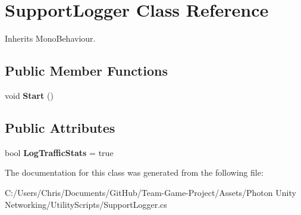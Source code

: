 \hypertarget{class_support_logger}{}\section{Support\+Logger Class Reference}
\label{class_support_logger}


Inherits Mono\+Behaviour.

\subsection*{Public Member Functions}
\begin{DoxyCompactItemize}
\item 
void {\bfseries Start} ()\hypertarget{class_support_logger_a27f7c71460d51d1cdb08735a4c5ca869}{}\label{class_support_logger_a27f7c71460d51d1cdb08735a4c5ca869}

\end{DoxyCompactItemize}
\subsection*{Public Attributes}
\begin{DoxyCompactItemize}
\item 
bool {\bfseries Log\+Traffic\+Stats} = true\hypertarget{class_support_logger_a73de1756bad6a637924df2975c088e47}{}\label{class_support_logger_a73de1756bad6a637924df2975c088e47}

\end{DoxyCompactItemize}


The documentation for this class was generated from the following file\+:\begin{DoxyCompactItemize}
\item 
C\+:/\+Users/\+Chris/\+Documents/\+Git\+Hub/\+Team-\/\+Game-\/\+Project/\+Assets/\+Photon Unity Networking/\+Utility\+Scripts/Support\+Logger.\+cs\end{DoxyCompactItemize}

